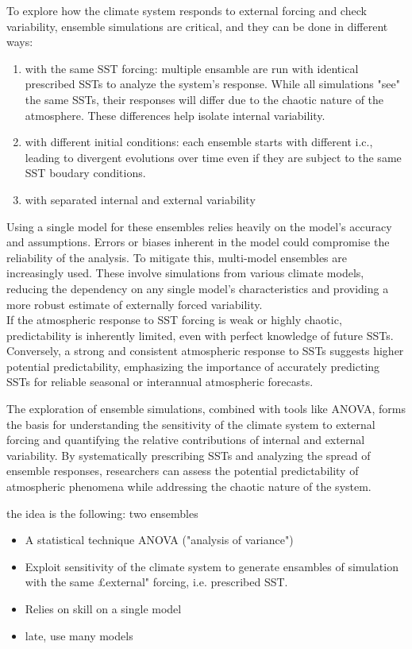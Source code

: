 To explore how the climate system responds to external forcing and check variability, ensemble simulations are critical, and they can be done in different ways:
\begin{enumerate}
	\item with the same SST forcing: multiple ensamble are run with identical prescribed SSTs to analyze the system's response. While all simulations "see" the same SSTs, their responses will differ due to the chaotic nature of the atmosphere. These differences help isolate internal variability.
	\item with different initial conditions: each ensemble starts with different i.c., leading to divergent evolutions over time even if they are subject to the same SST boudary conditions.
	\item with separated internal and external variability
\end{enumerate}
Using a single model for these ensembles relies heavily on the model's accuracy and assumptions. Errors or biases inherent in the model could compromise the reliability of the analysis.
To mitigate this, multi-model ensembles are increasingly used. These involve simulations from various climate models, reducing the dependency on any single model's characteristics and providing a more robust estimate of externally forced variability. \\

If the atmospheric response to SST forcing is weak or highly chaotic, predictability is inherently limited, even with perfect knowledge of future SSTs.
Conversely, a strong and consistent atmospheric response to SSTs suggests higher potential predictability, emphasizing the importance of accurately predicting SSTs for reliable seasonal or interannual atmospheric forecasts.

The exploration of ensemble simulations, combined with tools like ANOVA, forms the basis for understanding the sensitivity of the climate system to external forcing and quantifying the relative contributions of internal and external variability. By systematically prescribing SSTs and analyzing the spread of ensemble responses, researchers can assess the potential predictability of atmospheric phenomena while addressing the chaotic nature of the system.






the idea is the following: two ensembles
\begin{itemize}
	\item A statistical technique ANOVA ("analysis of variance")
	\item Exploit sensitivity of the climate system to generate ensambles of simulation with the same £external" forcing, i.e. prescribed SST.
	\item Relies on skill on a single model
	\item late, use many models
\end{itemize}


